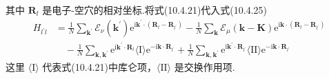 其中 $\boldsymbol{R}_{l}$ 是电子-空穴的相对坐标.将式(10.4.21)代入式(10.4.25)
\begin{equation}
\begin{aligned}
  H_{l^{\prime}l}&=\frac{1}{N}\sum_{\boldsymbol{k}^{\prime}}
  \mathscr{E}_{\nu}(\boldsymbol{k}^{\prime})
  \mathrm{e}^{\mathrm{i}\boldsymbol{k}^{\prime}\cdot(\boldsymbol{R}_{l}-\boldsymbol{R}_{l^{\prime}})}
  -\frac{1}{N}\sum_{\boldsymbol{k}}\mathscr{E}_{\mu}(\boldsymbol{k}-\boldsymbol{K})
  \mathrm{e}^{\mathrm{i}\boldsymbol{k}\cdot(\boldsymbol{R}_{l}-\boldsymbol{R}_{l^{\prime}})}\\
  &\quad-\frac{1}{N}\sum_{\boldsymbol{k},\boldsymbol{k}^{\prime}}
  \mathrm{e}^{\mathrm{i}\boldsymbol{k}^{\prime}\cdot\boldsymbol{R}_{l}}
  \langle\mathrm{I}\rangle
  \mathrm{e}^{-\mathrm{i}\boldsymbol{k}\cdot\boldsymbol{R}_{l^{\prime}}}
  +\frac{1}{N}\sum_{\boldsymbol{k},\boldsymbol{k}^{\prime}}
  \mathrm{e}^{\mathrm{i}\boldsymbol{k}^{\prime}\cdot\boldsymbol{R}_{l^{\prime}}}
  \langle\mathrm{II}\rangle
  \mathrm{e}^{-\mathrm{i}\boldsymbol{k}\cdot\boldsymbol{R}_{l^{\prime}}}
\end{aligned}
\end{equation}
这里 $\langle\mathrm{I}\rangle$ 代表式(10.4.21)中库仑项，$\langle\mathrm{II}\rangle$ 是交换作用项.
